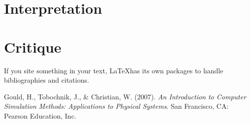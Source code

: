 \documentclass{article}%
\begin{document}
\section{Interpretation}

\section{Critique}
If you site something in your text, \LaTeX has its own packages to handle bibliographies and citations.

\begin{thebibliography}{1}
  Gould, H., Tobochnik, J., \& Christian, W. (2007). \textit{An Introduction to Computer Simulation Methods: Applications to Physical Systems}. San Francisco, CA: Pearson Education, Inc.
\end{thebibliography} 
\end{document}
